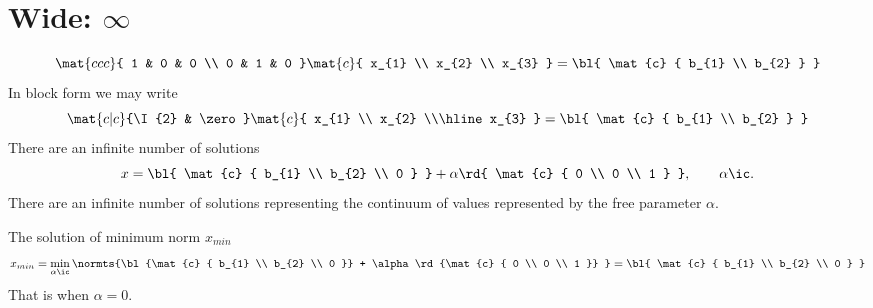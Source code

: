 \section{Wide: $\infty$}   %
  \begin{equation}
    \mat{ccc}{ 1 & 0 & 0 \\ 0 & 1 & 0 }
    \mat{c}  { x_{1} \\ x_{2} \\ x_{3} } =
    \bl{ \mat{c}  { b_{1} \\ b_{2} } }
  \end{equation}
In block form we may write
  \begin{equation}
    \mat{c|c}{\I{2} & \zero }
    \mat{c} { x_{1} \\ x_{2} \\\hline x_{3} } =
    \bl{ \mat{c}  { b_{1} \\ b_{2} } }
  \end{equation}
There are an infinite number of solutions
  \begin{equation}
    x = \bl{ \mat{c} { b_{1} \\ b_{2} \\ 0 } } + \alpha \rd{ \mat{c} { 0 \\ 0 \\ 1 } }, \qquad \alpha\ic .
  \end{equation}
There are an infinite number of solutions representing the continuum of values represented by the free parameter $\alpha$.

The solution of minimum norm $x_{min}$
  \begin{equation}
    x_{min} = \min_{\alpha\ic} \normts{\bl{\mat{c} { b_{1} \\ b_{2} \\ 0 }} + \alpha \rd{\mat{c} { 0 \\ 0 \\ 1 }} } = \bl{ \mat{c} { b_{1} \\ b_{2} \\ 0 } }
  \end{equation}
That is when $\alpha=0$.

